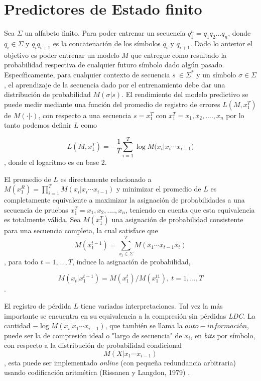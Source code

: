 \section{Predictores de Estado finito}


 

Sea $\Sigma$ un alfabeto finito. Para poder entrenar un secuencia $q_{1}^{n}=q_{1}q_{2} \dots q_{n}$, donde $q_{i} \in \Sigma$ y $q_{i}q_{i+1}$ es la concatenación de los símbolos $q_{i}$ y $q_{i+1}$. Dado lo anterior el objetivo es poder entrenar un modelo $M$ que entregue como resultado la probabilidad respectiva de cualquier futuro símbolo dado algún pasado. Específicamente, para cualquier contexto de secuencia $s \ \in \Sigma^{*} $ y un símbolo $\sigma \in \Sigma$, el aprendizaje de la secuencia dado por el entrenamiento debe dar una distribución de probabilidad $M(\sigma | s )$.
El rendimiento del modelo predictivo se puede medir mediante una función del promedio de registro de errores $L(M,x_{1}^{T})$ de $M (\cdot | \cdot )$, con respecto a una secuencia $s = x_{1}^{T}$ con $x_{1}^{T}= x_{1},x_{2},....,x_{n} $%
por lo tanto podemos definir $L$ como

\begin{equation} L( M , x_{1}^{T} ) = 
- \dfrac{1}{T} 
\sum _{i=1}^{T} \log{ M(x_{i} | x_{i} \cdots x_{i-1}} )\end{equation},
donde el logaritmo es en base 2. 

El promedio de $L$ es directamente relacionado a $M(x_{1}^{R}) = \prod_{i=1}^{T} M(x_{i} | x_{i} \cdots x_{i-1} ) $ y minimizar el promedio de $L$ es completamente equivalente a maximizar la asignación de probabilidades a una secuencia de pruebas $x_{1}^{T}= x_{1},x_{2},....,x_{n} $, teniendo en cuenta que esta equivalencia es totalmente válida. Sea $M(x_{1}^{T})$ una asignación de probabilidad consistente para una secuencia completa, la cual satisface que \begin{equation}
M(x_{1}^{t-1}) = \sum_{\mbox{$x_t$} \in \Sigma}^{T} M(x_{1} \cdots x_{t-1}x_{t} )
\end{equation}, para todo $t=1,...,T$, induce la asignación de probabilidad,

\begin{equation}
M(x_{t} | x_{1}^{t-1} ) = M(x_{1}^{t}) / M(x_{1}^{t1}),\ t=1,...,T 
\end{equation}.


El registro de pérdida $L$ tiene variadas interpretaciones. Tal vez la más importante se encuentra en su equivalencia a la compresión sin pérdidas \emph{LDC}. La cantidad $- \log M (x_{i} | x_{1} \cdots x_{i-1}) $, que también se llama la $auto-información$, puede ser la de compresión ideal o "largo de secuencia" de $x_{i}$, en \emph{bits} por símbolo, con respecto a la distribución de probabilidad condicional  \begin{equation}M (X | x_{1} \cdots x_{i-1})\end{equation}, esta puede ser implementado \emph{online} (con  pequeña redundancia arbitraria) usando codificación aritmética (Rissanen y Langdon, 1979)\cite{RissanenLangdon1979} .


